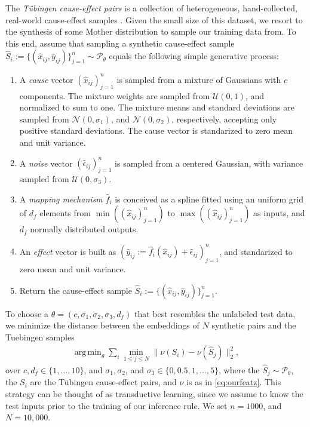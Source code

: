 \documentclass{article}
\DeclareMathOperator*{\argmin}{arg\,min}
\renewcommand{\P}{\mathcal{P}}
\newcommand{\U}{\mathcal{U}}
\newcommand{\N}{\mathcal{N}}
\begin{document}
The \emph{T\"ubingen cause-effect pairs} is a collection of heterogeneous,
hand-collected, real-world cause-effect samples \cite{Tuebingen14}.  Given the
small size of this dataset, we resort to the synthesis of some Mother distribution
to sample our training data from.  To this end, assume that
sampling a synthetic cause-effect sample $\hat{S}_i := \{(\hat{x}_{ij},
\hat{y}_{ij})\}_{j=1}^n \sim {\P}_\theta$ equals the following simple
generative process:
\begin{enumerate}
  \item A \emph{cause} vector $(\hat{x}_{ij})_{j=1}^{n}$ is sampled from a
  mixture of Gaussians with $c$ components. The mixture weights are
  sampled from $\U(0,1)$, and normalized to sum to one. The mixture means and
  standard deviations are sampled from $\N(0,\sigma_1)$, and $\N(0,\sigma_2)$,
  respectively, accepting only positive standard deviations.
  The cause vector is standarized to zero mean and unit variance.
  \item A \emph{noise} vector $(\hat{\epsilon}_{ij})_{j=1}^{n}$ is sampled from a
  centered Gaussian, with variance sampled from $\U(0,\sigma_3)$.
  \item A \emph{mapping mechanism} $\hat{f}_i$ is conceived as a spline fitted
  using an uniform grid of $d_f$ elements from
  $\min((\hat{x}_{ij})_{j=1}^n)$ to $\max((\hat{x}_{ij})_{j=1}^n)$ as inputs, and 
  $d_f$ normally distributed outputs.
  \item An \emph{effect} vector is built as $(\hat{y}_{ij} :=
  \hat{f}_i(\hat{x}_{ij})+\hat{\epsilon}_{ij})_{j=1}^n$, and
  standarized to zero mean and unit variance.
  \item Return the cause-effect sample $\hat{S}_i := \{(\hat{x}_{ij},
  \hat{y}_{ij})\}_{j=1}^n$.
\end{enumerate}
To choose a $\theta = (c,\sigma_1, \sigma_2, \sigma_3, d_f)$
that best resembles the unlabeled test data, we minimize the distance between the
embeddings of $N$ synthetic pairs and the Tuebingen samples 
\begin{align}\label{eq:Motherobj}
  \argmin_\theta \sum_{i}^{} \min_{1 \leq j \leq N} \| \nu(S_i)-\nu(\hat{S}_j) \|^2_2,
\end{align}
over $c,d_f \in \{1, \ldots, 10\}$, and $\sigma_1, \sigma_2$, and $\sigma_3 \in \{0,
0.5, 1, \ldots, 5\}$, where the $\hat{S}_j \sim \P_\theta$, the $S_i$ are the
T\"ubingen cause-effect pairs, and $\nu$ is as in \eqref{eq:ourfeatz}.
This strategy can be thought of as transductive learning, since we assume to
know the test inputs prior to the training of our inference rule. 
We set $n = 1000$, and $N = 10,000$.
\end{document}

